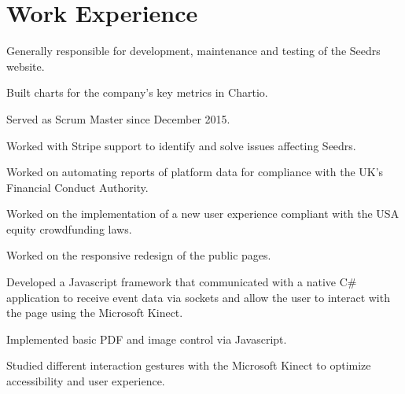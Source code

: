 \documentclass[letterpaper]{deedy-resume} %
\begin{document}
\begin{minipage}[t]{0.66\textwidth} %


\section{Work Experience}


\vspace{\topsep} %
\begin{tightitemize}
\item Generally responsible for development, maintenance and testing of the Seedrs website.
\item Built charts for the company's key metrics in Chartio.
\item Served as Scrum Master since December 2015.
\item Worked with Stripe support to identify and solve issues affecting Seedrs.
\item Worked on automating reports of platform data for compliance with the UK's Financial Conduct Authority.
\item Worked on the implementation of a new user experience compliant with the USA equity crowdfunding laws.
\item Worked on the responsive redesign of the public pages.
\end{tightitemize}

\sectionspace %



\begin{tightitemize}
\item Developed a Javascript framework that communicated with a native C\# application to receive event data via sockets and allow the user to interact with the page using the Microsoft Kinect.
\item Implemented basic PDF and image control via Javascript.
\item Studied different interaction gestures with the Microsoft Kinect to optimize accessibility and user experience.
\end{tightitemize}


\end{minipage}
\end{document}
